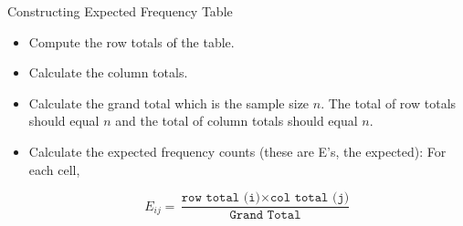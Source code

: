 \documentclass[14pt]{beamer}\usepackage[]{graphicx}\usepackage[]{color}
\begin{document}
\begin{frame}[fragile]{Constructing Expected Frequency Table}

\begin{itemize}
\item<1-> Compute the row totals of the table.  
\item<2-> Calculate the column totals.
\item<3-> Calculate the grand total which is the sample size $n$. The total of  row totals should equal $n$ and the total of column totals should  equal $n$.
\item<4-> Calculate the expected frequency counts (these are E's, the  expected): For each cell,

{\small{
\begin{equation*}
E_{ij} = \frac{\texttt{row total (i)} \times \texttt{col total (j)} }{\texttt{Grand Total}}
\end{equation*}
}}
\end{itemize}
\end{frame}
\end{document}
